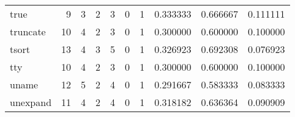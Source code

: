 \begin{longtable}{lrrrrrrrrr}
true      &                                       9 &                                                  3 &                                                  2 &                                                  3 &                                                  0 &                                                  1 &                                           0.333333 &                               0.666667 &                             0.111111 \\
truncate  &                                      10 &                                                  4 &                                                  2 &                                                  3 &                                                  0 &                                                  1 &                                           0.300000 &                               0.600000 &                             0.100000 \\
tsort     &                                      13 &                                                  4 &                                                  3 &                                                  5 &                                                  0 &                                                  1 &                                           0.326923 &                               0.692308 &                             0.076923 \\
tty       &                                      10 &                                                  4 &                                                  2 &                                                  3 &                                                  0 &                                                  1 &                                           0.300000 &                               0.600000 &                             0.100000 \\
uname     &                                      12 &                                                  5 &                                                  2 &                                                  4 &                                                  0 &                                                  1 &                                           0.291667 &                               0.583333 &                             0.083333 \\
unexpand  &                                      11 &                                                  4 &                                                  2 &                                                  4 &                                                  0 &                                                  1 &                                           0.318182 &                               0.636364 &                             0.090909 \\

\end{longtable}
